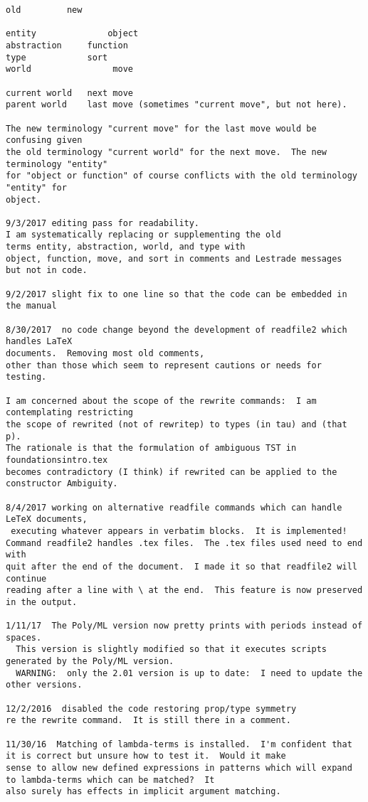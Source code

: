 \documentclass{article}
\begin{document}
{\begin{verbatim}
old			new

entity		        object
abstraction   	function
type			sort
world                move

current world	next move
parent world	last move (sometimes "current move", but not here).

The new terminology "current move" for the last move would be confusing given
the old terminology "current world" for the next move.  The new terminology "entity"
for "object or function" of course conflicts with the old terminology "entity" for
object.

9/3/2017 editing pass for readability.  
I am systematically replacing or supplementing the old
terms entity, abstraction, world, and type with 
object, function, move, and sort in comments and Lestrade messages
but not in code.

9/2/2017 slight fix to one line so that the code can be embedded in the manual

8/30/2017  no code change beyond the development of readfile2 which handles LaTeX
documents.  Removing most old comments, 
other than those which seem to represent cautions or needs for testing.

I am concerned about the scope of the rewrite commands:  I am contemplating restricting
the scope of rewrited (not of rewritep) to types (in tau) and (that p).  
The rationale is that the formulation of ambiguous TST in foundationsintro.tex 
becomes contradictory (I think) if rewrited can be applied to the constructor Ambiguity.

8/4/2017 working on alternative readfile commands which can handle LeTeX documents,
 executing whatever appears in verbatim blocks.  It is implemented!  
Command readfile2 handles .tex files.  The .tex files used need to end with 
quit after the end of the document.  I made it so that readfile2 will continue 
reading after a line with \ at the end.  This feature is now preserved in the output.

1/11/17  The Poly/ML version now pretty prints with periods instead of spaces.
  This version is slightly modified so that it executes scripts generated by the Poly/ML version.
  WARNING:  only the 2.01 version is up to date:  I need to update the
other versions.

12/2/2016  disabled the code restoring prop/type symmetry 
re the rewrite command.  It is still there in a comment.

11/30/16  Matching of lambda-terms is installed.  I'm confident that it is correct but unsure how to test it.  Would it make
sense to allow new defined expressions in patterns which will expand to lambda-terms which can be matched?  It
also surely has effects in implicit argument matching.


\end{verbatim}}
\end{document}
